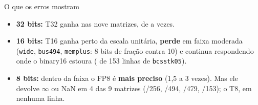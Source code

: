 \documentclass[aspectratio=169,10pt]{beamer}
\newcommand{\code}[1]{\texttt{#1}}
\begin{document}
\begin{frame}{O que os erros mostram}
  \centering\scriptsize
  \setlength{\tabcolsep}{2.5pt}
  \vspace{1.5mm}
  \small
  \begin{itemize}
    \item \textbf{32 bits:} T32 ganha nas nove matrizes, de \RATA{} a \RATB{} vezes.
    \item \textbf{16 bits:} T16 ganha perto da escala unitária, \textbf{perde} em faixa moderada
          (\code{wide}, \code{bus494}, \code{memplus}: 8 bits de fração contra 10) e continua respondendo onde o binary16
          estoura (\NFBCSH{} de 153 linhas de \code{bcsstk05}).
    \item \textbf{8 bits:} dentro da faixa o FP8 é \textbf{mais preciso} (1,5 a 3 vezes). Mas ele devolve
          $\infty$ ou NaN em 4 das 9 matrizes (\FPEIGHTBAD/256, \NFBUS/494, \NFWEST/479, \NFBCS/153); o T8,
          em nenhuma linha.
  \end{itemize}
\end{frame}
\end{document}
